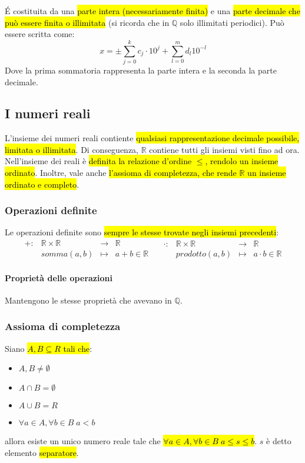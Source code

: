 \'E costituita da una \hl{parte intera (necessariamente finita)} e una \hl{parte
decimale che può essere finita o illimitata} (si ricorda che in $\mathbb{Q}$ solo
illimitati periodici). Può essere scritta come:
\[ x = \pm \sum_{j=0}^k c_j \cdot 10^j + \sum_{l=0}^m d_l 10^{-l} \]
Dove la prima sommatoria rappresenta la parte intera e la seconda la parte 
decimale.

\subsection{I numeri reali}
L'insieme dei numeri reali contiente \hl{qualsiasi rappresentazione decimale
possibile, limitata o illimitata}. Di conseguenza, $\mathbb{R}$ contiene tutti
gli insiemi visti fino ad ora. Nell'insieme dei reali è \hl{definita la relazione
d'ordine $\leq$, rendolo un insieme ordinato}. Inoltre, vale anche \hl{l'assioma
di completezza, che rende $\mathbb{R}$ un insieme ordinato e completo}.

\subsubsection{Operazioni definite}
Le operazioni definite sono \hl{sempre le stesse trovate negli insiemi precedenti}:
\[
    \begin{array}{cccc}
        +: &\mathbb{R} \times \mathbb{R} &\to &\mathbb{R} \\
        &somma(a,b) &\mapsto & a + b \in \mathbb{R}
    \end{array} \quad
    \begin{array}{cccc}
        \cdot: &\mathbb{R} \times \mathbb{R} &\to &\mathbb{R} \\
        &prodotto(a,b) &\mapsto & a \cdot b \in \mathbb{R}
    \end{array}
\]

\paragraph{Proprietà delle operazioni} Mantengono le stesse proprietà che 
avevano in $\mathbb{Q}$.

\subsubsection{Assioma di completezza}\label{sec:assioma-completezza}
Siano \hl{$A, B \subseteq R$ tali che}:
\begin{itemize}
    \item $A,B \neq \emptyset$
    \item $A \cap B = \emptyset$ 
    \item $A \cup B = R$
    \item $\forall a \in A, \forall b \in B \; a < b$ 
\end{itemize}
allora esiste un unico numero reale tale che 
\hl{$\forall a \in A, \forall b \in B \; a \leq s \leq b$}. $s$ è detto elemento 
\hl{separatore}. 

